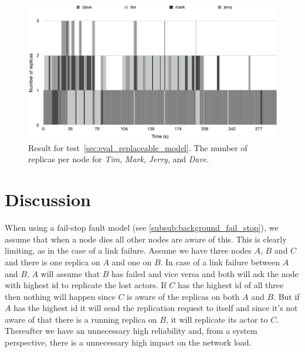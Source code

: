\documentclass{cslthse-msc}
\begin{document}
\begin{figure}[!hbt]
\centering
\includegraphics[scale=0.5]{images/results/loads/unloaded.pdf}
\caption{Result for test~\ref{sec:eval_replaceable_model}. The number of replicas per node for \emph{Tim}, \emph{Mark}, \emph{Jerry}, and \emph{Dave}.} \label{fig:eval_replaceable_model_unloaded}
\end{figure}

\chapter{Discussion} \label{ch:discussion}

When using a fail-stop fault model (see \cref{subsub:background_fail_stop}), we assume that when a node dies all other nodes are aware of this. This is clearly limiting, as in the case of a link failure. Assume we have three nodes $A$, $B$ and $C$ and there is one replica on $A$ and one on $B$. In case of a link failure between $A$ and $B$, $A$ will assume that $B$ has failed and vice versa and both will ask the node with highest id to replicate the lost actors. If $C$ has the highest id of all three then nothing will happen since $C$ is aware of the replicas on both $A$ and $B$. But if $A$ has the highest id it will send the replication request to itself and since it's not aware of that there is a running replica on $B$, it will replicate its actor to $C$. Thereafter we have an unnecessary high reliability and, from a system perspective, there is a unnecessary high impact on the network load.
\end{document}
